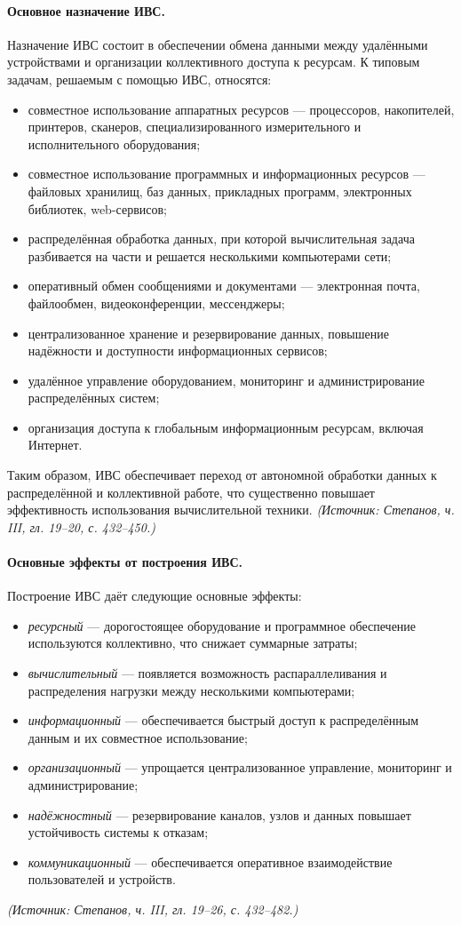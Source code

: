 \documentclass[a4paper,12pt]{article}
\begin{document}
\paragraph{Основное назначение ИВС.}
Назначение ИВС состоит в обеспечении обмена данными между удалёнными устройствами и организации коллективного доступа к ресурсам. К типовым задачам, решаемым с помощью ИВС, относятся:
\begin{itemize}
\item совместное использование аппаратных ресурсов — процессоров, накопителей, принтеров, сканеров, специализированного измерительного и исполнительного оборудования;
\item совместное использование программных и информационных ресурсов — файловых хранилищ, баз данных, прикладных программ, электронных библиотек, web-сервисов;
\item распределённая обработка данных, при которой вычислительная задача разбивается на части и решается несколькими компьютерами сети;
\item оперативный обмен сообщениями и документами — электронная почта, файлообмен, видеоконференции, мессенджеры;
\item централизованное хранение и резервирование данных, повышение надёжности и доступности информационных сервисов;
\item удалённое управление оборудованием, мониторинг и администрирование распределённых систем;
\item организация доступа к глобальным информационным ресурсам, включая Интернет.
\end{itemize}
Таким образом, ИВС обеспечивает переход от автономной обработки данных к распределённой и коллективной работе, что существенно повышает эффективность использования вычислительной техники.
\textit{(Источник: Степанов, ч. III, гл. 19–20, с. 432–450.)}

\paragraph{Основные эффекты от построения ИВС.}
Построение ИВС даёт следующие основные эффекты:
\begin{itemize}
\item \emph{ресурсный} — дорогостоящее оборудование и программное обеспечение используются коллективно, что снижает суммарные затраты;
\item \emph{вычислительный} — появляется возможность распараллеливания и распределения нагрузки между несколькими компьютерами;
\item \emph{информационный} — обеспечивается быстрый доступ к распределённым данным и их совместное использование;
\item \emph{организационный} — упрощается централизованное управление, мониторинг и администрирование;
\item \emph{надёжностный} — резервирование каналов, узлов и данных повышает устойчивость системы к отказам;
\item \emph{коммуникационный} — обеспечивается оперативное взаимодействие пользователей и устройств.
\end{itemize}
\textit{(Источник: Степанов, ч. III, гл. 19–26, с. 432–482.)}
\end{document}
